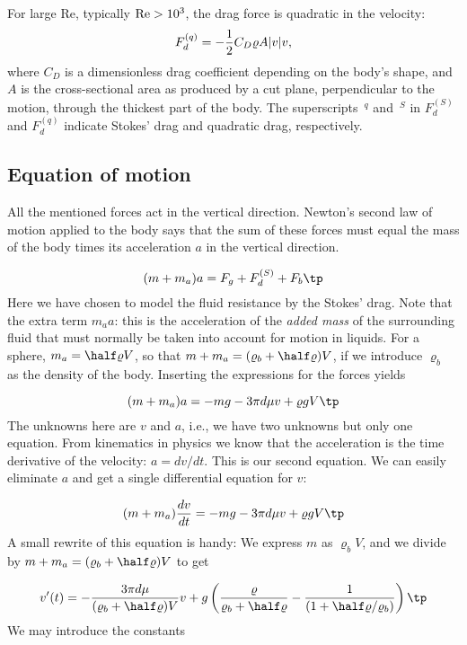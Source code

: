 \documentclass[graybox,sectrefs,envcountresetchap,open=right,final]{svmonodo}
\begin{document}
For large Re, typically $\hbox{Re} > 10^3$, the drag force is quadratic
in the velocity:
\begin{equation}
F_d^{(q)} = -{1\over2}C_D\varrho A|v|v,
\end{equation}
where $C_D$ is a dimensionless drag coefficient depending on the body's shape,
and $A$ is the cross-sectional area as
produced by a cut plane, perpendicular to the motion, through the thickest
part of the body. The superscripts $\,{}^q$ and $\,{}^S$ in
$F_d^{(S)}$ and $F_d^{(q)}$ indicate Stokes' drag and quadratic drag,
respectively.

\subsection{Equation of motion}

All the mentioned forces act in the vertical direction.
Newton's second law of motion applied to the body says that the sum of
these forces must equal the mass of the body times its acceleration
$a$ in the vertical direction.

\begin{equation*} (m+m_a)a = F_g + F_d^{(S)} + F_b \tp\end{equation*}
Here we have chosen to model the fluid resistance by the Stokes' drag.
Note that the extra term $m_a a$: this is the acceleration of
the \emph{added mass} of the surrounding fluid that must
normally be taken into account for motion in liquids.
For a sphere, $m_a = \half \varrho V$, so that
$m+m_a = (\varrho_b +\half\varrho)V$, if we introduce $\varrho_b$ as the
density of the body.
Inserting the expressions for the forces yields

\[  (m+m_a)a = -mg - 3\pi d\mu v + \varrho gV
\tp
\]
The unknowns here are $v$ and $a$, i.e., we have two unknowns but only
one equation. From kinematics in physics we know that
the acceleration is the time derivative of the velocity: $a = dv/dt$.
This is our second equation.
We can easily eliminate $a$ and get a single differential equation for $v$:

\[ (m+m_a){dv\over dt} = -mg - 3\pi d\mu v + \varrho gV
\tp
\]
A small rewrite of this equation is handy: We express $m$ as $\varrho_bV$,
and we divide by $m+m_a = (\varrho_b +\half\varrho)V$ to get

\begin{equation}
v^{\prime}(t) = - \frac{3\pi d\mu}{(\varrho_b +\half\varrho)V} v + g\left(\frac{\varrho}{\varrho_b +\half\varrho} -\frac{1}{(1 +\half\varrho/\varrho_b)}\right)
\label{decay:app:fallingbody:model:S}
\tp
\end{equation}
We may introduce the constants
\end{document}
